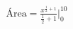 \documentclass[preview]{standalone}
\begin{document}
\begin{align*}
\text{Área} = \frac{x^{\frac{1}{2}+1}}{\frac{1}{2}+1}\bigg|_{0}^{10}
\end{align*}
\end{document}
